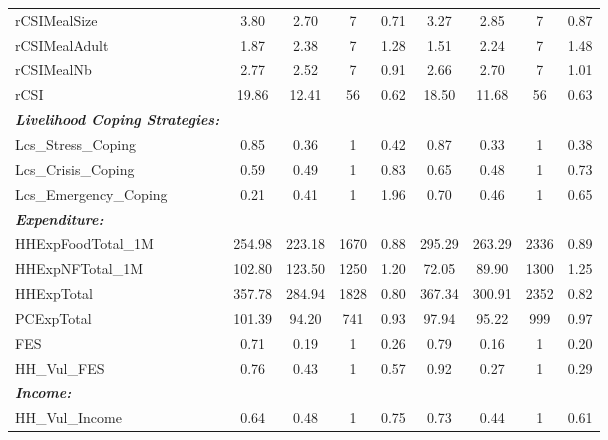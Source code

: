 {\begin{tabular}{l*{2}{cccc}}
rCSIMealSize&        3.80&        2.70&           7&        0.71&        3.27&        2.85&           7&        0.87\\
rCSIMealAdult&        1.87&        2.38&           7&        1.28&        1.51&        2.24&           7&        1.48\\
rCSIMealNb  &        2.77&        2.52&           7&        0.91&        2.66&        2.70&           7&        1.01\\
rCSI        &       19.86&       12.41&          56&        0.62&       18.50&       11.68&          56&        0.63\\
  \textbf{\textit{Livelihood Coping Strategies:}}&            &            &            &            &            &            &            &            \\
Lcs\_Stress\_Coping&        0.85&        0.36&           1&        0.42&        0.87&        0.33&           1&        0.38\\
Lcs\_Crisis\_Coping&        0.59&        0.49&           1&        0.83&        0.65&        0.48&           1&        0.73\\
Lcs\_Emergency\_Coping&        0.21&        0.41&           1&        1.96&        0.70&        0.46&           1&        0.65\\
  \textbf{\textit{Expenditure:}}&            &            &            &            &            &            &            &            \\
HHExpFoodTotal\_1M&      254.98&      223.18&        1670&        0.88&      295.29&      263.29&        2336&        0.89\\
HHExpNFTotal\_1M&      102.80&      123.50&        1250&        1.20&       72.05&       89.90&        1300&        1.25\\
HHExpTotal  &      357.78&      284.94&        1828&        0.80&      367.34&      300.91&        2352&        0.82\\
PCExpTotal  &      101.39&       94.20&         741&        0.93&       97.94&       95.22&         999&        0.97\\
FES         &        0.71&        0.19&           1&        0.26&        0.79&        0.16&           1&        0.20\\
HH\_Vul\_FES  &        0.76&        0.43&           1&        0.57&        0.92&        0.27&           1&        0.29\\
      \textbf{\textit{Income:}}&            &            &            &            &            &            &            &            \\
HH\_Vul\_Income&        0.64&        0.48&           1&        0.75&        0.73&        0.44&           1&        0.61\\
\hline\hline
\end{tabular}
}
